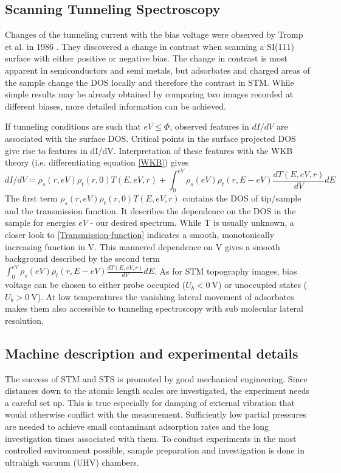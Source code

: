 \subsection{\textbf{S}canning \textbf{T}unneling \textbf{S}pectroscopy}
\label{section:STS}
Changes of the tunneling current with the bias voltage were observed by Tromp et al. in 1986 \cite{tromp_atomic_1986}. They discovered a change in contrast when scanning a SI(111) surface with either positive or negative bias. The change in contrast is most apparent in semiconductors and semi metals\cite{bonnell_scanning_1993}, but adsorbates and charged areas of the sample change the DOS locally and therefore the contrast in STM. While simple results may be already obtained by comparing two images recorded at different biases, more detailed information can be achieved.

If tunneling conditions are such that $eV\leq\Phi$, observed features in $dI/dV$ are associated with the surface DOS. Critical points in the surface projected DOS give rise to features in dI/dV. Interpretation of these features with the WKB theory (i.e. differentiating equation \eqref{WKB}) gives
\begin{equation}
dI/dV=\rho_s(r,eV)\rho_t(r,0)T(E,eV,r)+\int_0^{eV}\rho_s(eV)\rho_t(r,E-eV)\frac{dT(E,eV,r)}{dV}dE
\label{eq:dI/dV}
\end{equation}
The first term $\rho_s(r,eV)\rho_t(r,0)T(E,eV,r)$ contains the DOS of tip/sample and the transmission function. It describes the dependence on the DOS in the sample for energies $eV$ - our desired spectrum.  While T is usually unknown, a closer look to \eqref{Transmission-function} indicates a smooth, monotonically increasing function in V. This mannered dependence on V gives a smooth background described by the second term $\int_0^{eV}\rho_s(eV)\rho_t(r,E-eV)\frac{dT(E,eV,r)}{dV}dE$.
 As for STM topography images, bias voltage can be chosen to either probe occupied ($U_b < \SI{0}{\volt}$) or unoccupied states ($U_b > \SI{0}{\volt}$).  At low temperatures the vanishing lateral movement of adsorbates makes them also accessible to tunneling spectroscopy with sub molecular lateral resolution. 

\subsection{Machine description and experimental details}
The success of STM and STS is promoted by good mechanical engineering. Since distances down to the atomic length scales are investigated, the experiment needs a careful set up. This is true especially for damping of external vibration that would otherwise conflict with the measurement. Sufficiently low partial pressures are needed to achieve small contaminant adsorption rates and the long investigation times associated with them. To conduct experiments in the most controlled environment possible, sample preparation and investigation is done in ultrahigh vacuum (UHV) chambers.

